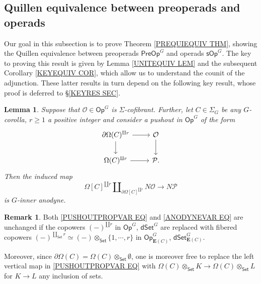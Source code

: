 \documentclass[a4paper,10pt
,draft
]{article}%
\numberwithin{equation}{section}
\numberwithin{figure}{section}
\newtheorem{lemma}[equation]{Lemma}%
\theoremstyle{definition} %
\newtheorem{remark}[equation]{Remark}%
\newcommand{\1}{\ensuremath{\mathbbm 1}}%
\begin{document}
\subsection{Quillen equivalence between preoperads and operads}
\label{PREOPOPEQUIV SEC}

Our goal in this subsection is to prove
Theorem \ref{PREQUIEQUIV THM},
showing the Quillen equivalence between
preoperads $\mathsf{PreOp}^G$
and operads $\mathsf{sOp}^G$.
The key to proving this result is given by 
Lemma \ref{UNITEQUIV LEM}
and the subsequent
Corollary \ref{KEYEQUIV COR},
which allow us to understand the counit of the adjunction.
These latter results in turn depend on the following key 
result, whose proof is deferred to \S \ref{KEYRES SEC}.


\begin{lemma}\label{KEYPRVAR LEM}
	Suppose that $\mathcal{O} \in \mathsf{Op}^{G}$
	is $\Sigma$-cofibrant.
	Further, let $C \in \Sigma_G$ be any $G$-corolla,
	$r \geq 1$ a positive integer and consider 
	a pushout in $\mathsf{Op}^{G}$ of the form
\begin{equation}\label{PUSHOUTPROPVAR EQ}
	\begin{tikzcd}
	\partial \Omega(C)^{\amalg r} \ar{r} \ar{d} 
	& \mathcal{O} \ar{d}
\\
	\Omega(C)^{\amalg r} \ar{r} & \mathcal{P}.
	\end{tikzcd}
\end{equation}
	Then the induced map
\begin{equation}\label{ANODYNEVAR EQ}
	\Omega[C]^{\amalg r} 
	\amalg_{\partial \Omega[C]^{\amalg r}} N\mathcal{O} \to N\mathcal{P}
\end{equation}
	is $G$-inner anodyne.
\end{lemma}

\begin{remark}\label{KEYPRVAR REM}
	Both \eqref{PUSHOUTPROPVAR EQ} and \eqref{ANODYNEVAR EQ}
	are unchanged if the copowers $(-)^{\amalg r}$ in 
	$\mathsf{Op}^G$, $\mathsf{dSet}^G$
	are replaced with fibered copowers 
	$(-)^{\amalg_{\mathsf{Set}} r} \simeq 
	(-) \otimes_{\mathsf{Set}} \{1,\cdots,r\}$
	in 
	$\mathsf{Op}^G_{\boldsymbol{E}(C)}$,
	$\mathsf{dSet}^G_{\boldsymbol{E}(C)}$.
	
	Moreover, since 
	$\partial \Omega(C) = \Omega(C) \otimes_{\mathsf{Set}} \emptyset$,
	one is moreover free to replace
	the left vertical map in \eqref{PUSHOUTPROPVAR EQ}
	with 
	$\Omega(C) \otimes_{\mathsf{Set}} K
	\to
	\Omega(C) \otimes_{\mathsf{Set}} L$
	for $K\to L$ any inclusion of sets.
\end{remark}
\end{document}

